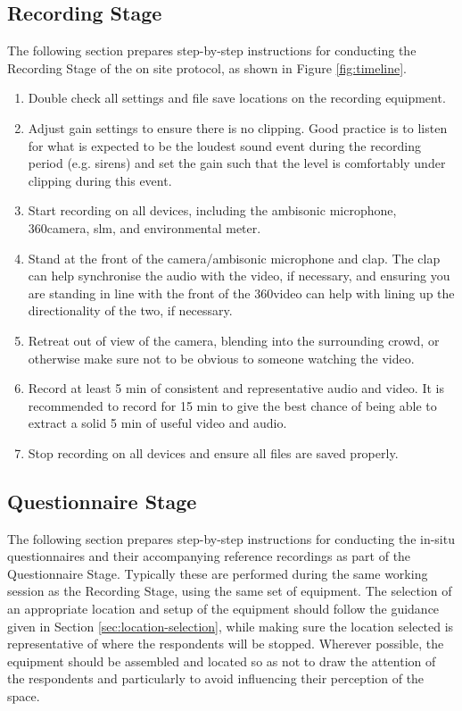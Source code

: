  \subsection{Recording Stage}

   The following section prepares step-by-step instructions for conducting the Recording Stage of the on site protocol, as shown in Figure \ref{fig:timeline}.

   \begin{enumerate}
     \item Double check all settings and file save locations on the recording equipment.
     \item Adjust gain settings to ensure there is no clipping. Good practice is to listen for what is expected to be the loudest sound event during the recording period (e.g. sirens) and set the gain such that the level is comfortably under clipping during this event.
     \item Start recording on all devices, including the ambisonic microphone, 360\degree camera, \gls{slm}, and environmental meter.
     \item Stand at the front of the camera/ambisonic microphone and clap. The clap can help synchronise the audio with the video, if necessary, and ensuring you are standing in line with the front of the 360\degree video can help with lining up the directionality of the two, if necessary.
     \item Retreat out of view of the camera, blending into the surrounding crowd, or otherwise make sure not to be obvious to someone watching the video.
     \item Record at least 5 min of consistent and representative audio and video. It is recommended to record for 15 min to give the best chance of being able to extract a solid 5 min of useful video and audio.
     \item Stop recording on all devices and ensure all files are saved properly.
   \end{enumerate}

 \subsection{Questionnaire Stage}

   The following section prepares step-by-step instructions for conducting the in-situ questionnaires and their accompanying reference recordings as part of the Questionnaire Stage. Typically these are performed during the same working session as the Recording Stage, using the same set of equipment. The selection of an appropriate location and setup of the equipment should follow the guidance given in Section \ref{sec:location-selection}, while making sure the location selected is representative of where the respondents will be stopped. Wherever possible, the equipment should be assembled and located so as not to draw the attention of the respondents and particularly to avoid influencing their perception of the space.

